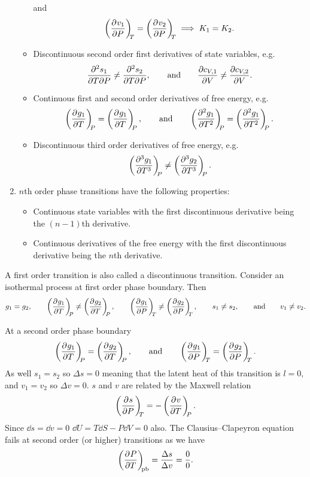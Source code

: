 \begin{enumerate}
\begin{itemize}
            and
            \[\left(\pdv[]{v_1}{P}\right)_{\!\!{T}} = \left(\pdv[]{v_2}{P}\right)_{\!\!{T}} \implies K_1 = K_2.\]
            \item Discontinuous second order first derivatives of state variables, e.g.
            \[\pdv[2]{s_1}{T}{P} \ne \pdv[2]{s_2}{T}{P}, \qquad\text{and}\qquad \pdv{c_{V,1}}{V} \ne \pdv{c_{V,2}}{V}.\]
            \item Continuous first and second order derivatives of free energy, e.g.
            \[\pdvconst{g_1}{T}{P} = \pdvconst{g_1}{T}{P}, \qquad\text{and}\qquad \pdvconst[2]{g_1}{T}{P} = \pdvconst[2]{g_1}{T}{P}.\]
            \item Discontinuous third order derivatives of free energy, e.g.
            \[\left(\pdv[3]{g_1}{T}\right)_{\!\!{P}} \ne \left(\pdv[3]{g_2}{T}\right)_{\!\!{P}}.\]
        \end{itemize}
        \item \(n\)th order phase transitions have the following properties:
        \begin{itemize}
            \item Continuous state variables with the first discontinuous derivative being the \((n - 1)\)th derivative.
            \item Continuous derivatives of the free energy with the first discontinuous derivative being the \(n\)th derivative.
        \end{itemize}
    \end{enumerate}
    
    A first order transition is also called a discontinuous transition.
    Consider an isothermal process at first order phase boundary.
    Then
    \[g_1 = g_2, \qquad \pdvconst{g_1}{T}{P} \ne \pdvconst{g_2}{T}{P}, \qquad \pdvconst{g_1}{P}{T} \ne \pdvconst{g_2}{P}{T}, \qquad s_1 \ne s_2, \qquad\text{and}\qquad v_1 \ne v_2.\]
    
    At a second order phase boundary
    \[\pdvconst{g_1}{T}{P} = \pdvconst{g_2}{T}{P}, \qquad\text{and}\qquad \pdvconst{g_1}{P}{T} = \pdvconst{g_2}{P}{T}.\]
    As well \(s_1 = s_2\) so \(\Delta s = 0\) meaning that the latent heat of this transition is \(l = 0\), and \(v_1 = v_2\) so \(\Delta v = 0\).
    \(s\) and \(v\) are related by the Maxwell relation
    \[\left(\pdv[]{s}{P}\right)_{\!\!{T}} = -\left(\pdv[]{v}{T}\right)_{\!\!{P}}.\]
    Since \(\dd{s} = \dd{v} = 0\) \(\dd{U} = T\dd{S} - P\dd{V} = 0\) also.
    The Clausius--Clapeyron equation fails at second order (or higher) transitions as we have
    \[\left(\pdv[]{P}{T}\right)_{\!\!{\mathrm{pb}}} = \frac{\Delta s}{\Delta 
    v} = \frac{0}{0}.\]
    
